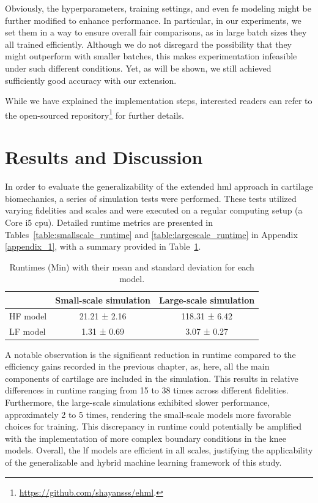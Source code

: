 Obviously, the hyperparameters, training settings, and even \ac{fe} modeling might be further modified to enhance performance. In particular, in our experiments, we set them in a way to ensure overall fair comparisons, as in large batch sizes they all trained efficiently. Although we do not disregard the possibility that they might outperform with smaller batches, this makes experimentation infeasible under such different conditions. Yet, as will be shown, we still achieved sufficiently good accuracy with our extension.

While we have explained the implementation steps, interested readers can refer to the open-sourced repository\footnote{\href{https://github.com/shayansss/ehml}{https://github.com/shayansss/ehml}.} for further details.

\section{Results and Discussion}
%
In order to evaluate the generalizability of the extended \ac{hml} approach in cartilage biomechanics, a series of simulation tests were performed. These tests utilized varying fidelities and scales and were executed on a regular computing setup (a Core i5 \ac{cpu}). Detailed runtime metrics are presented in Tables~\ref{table:smallscale_runtime} and \ref{table:largescale_runtime} in Appendix \ref{appendix_1}, with a summary provided in Table~\ref{tabel:runtimes_stats}.
%
\begin{table}[H]
\caption{Runtimes (Min) with their mean and standard deviation for each model.}\centering
\label{tabel:runtimes_stats}
\begin{tabular}{lcc}
\toprule
 & \textbf{Small-scale simulation} & \textbf{Large-scale simulation} \\
\midrule
HF model & 21.21 ± 2.16 & 118.31 ± 6.42 \\
LF model & 1.31 ± 0.69 & 3.07 ± 0.27 \\
\bottomrule
\end{tabular}
\end{table}

A notable observation is the significant reduction in runtime compared to the efficiency gains recorded in the previous chapter, as, here, all the main components of cartilage are included in the simulation. This results in relative differences in runtime ranging from 15 to 38 times across different fidelities. Furthermore, the large-scale simulations exhibited slower performance, approximately 2 to 5 times, rendering the small-scale models more favorable choices for training. This discrepancy in runtime could potentially be amplified with the implementation of more complex boundary conditions in the knee models. Overall, the \ac{lf} models are efficient in all scales, justifying the applicability of the generalizable and hybrid machine learning framework of this study.

